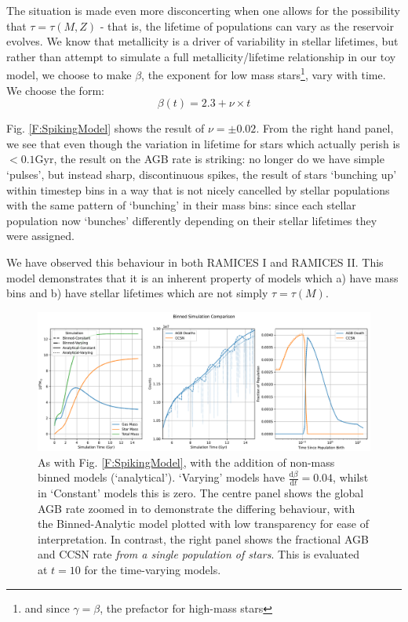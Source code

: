 \documentclass[a4paper,11pt]{article}
\def\d{\mathrm d}
\begin{document}
				The situation is made even more disconcerting when one allows for the possibility that $\tau = \tau(M,Z)$ - that is, the lifetime of populations can vary as the reservoir evolves. We know that metallicity is a driver of variability in stellar lifetimes, but rather than attempt to simulate a full metallicity/lifetime relationship in our toy model, we choose to make $\beta$, the exponent for low mass stars\footnote{and since $\gamma = \beta$, the prefactor for high-mass stars}, vary with time. We choose the form:
				\begin{equation}
					\beta(t) = 2.3 + \nu \times t
				\end{equation} 

				Fig. \ref{F:SpikingModel} shows the result of $\nu = \pm 0.02$. From the right hand panel, we see that even though the variation in lifetime for stars which actually perish is $<0.1$Gyr, the result on the AGB rate is striking: no longer do we have simple `pulses', but instead sharp, discontinuous spikes, the result of stars `bunching up' within timestep bins in a way that is not nicely cancelled by stellar populations with the same pattern of `bunching' in their mass bins: since each stellar population now `bunches' differently depending on their stellar lifetimes they were assigned. 

				We have observed this behaviour in both RAMICES I and RAMICES II. This model demonstrates that it is an inherent property of models which a) have mass bins and b) have stellar lifetimes which are not simply $\tau = \tau(M)$.



				\begin{figure}
					\begin{center}
					\includegraphics[width=\linewidth,height=0.4\paperheight,keepaspectratio=true]{BinComparison_Varying.pdf}
					\caption{As with Fig. \ref{F:SpikingModel}, with the addition of non-mass binned models (`analytical'). `Varying' models have $\frac{\d\beta}{\d t} = 0.04$, whilst in `Constant' models this is zero. The centre panel shows the global AGB rate zoomed in to demonstrate the differing behaviour, with the Binned-Analytic model plotted with low transparency for ease of interpretation. In contrast, the right panel shows the fractional AGB and CCSN rate \textit{from a single population of stars}. This is evaluated at $t = 10$ for the time-varying models. }\label{F:AnalyticModel}
					\end{center}
				\end{figure}
\end{document}
